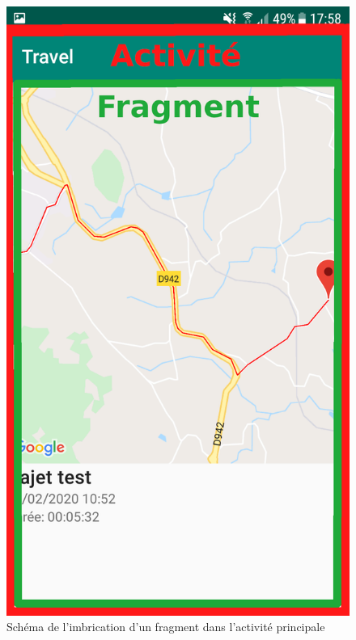 \begin{figure}[ht]
  \label{Activité-Fragment}
  \centering
  \includegraphics[scale=0.13]{images/activity-fragment.png}
  \caption{Schéma de l'imbrication d'un fragment dans l'activité principale}
\end{figure}


